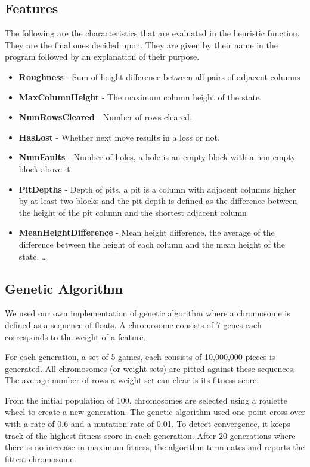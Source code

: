 \documentclass[twocolumn,12pt,journal]{IEEEtran_modified}
\begin{document}
\subsection{Features}
The following are the characteristics that are evaluated in the heuristic function. They are the final ones decided upon. They are given by their name in the program followed by an explanation of their purpose.
\begin{itemize}
  \item \textbf{Roughness} - Sum of height difference between all pairs of adjacent columns
  \item \textbf{MaxColumnHeight} - The maximum column height of the state.
  \item \textbf{NumRowsCleared} - Number of rows cleared.
  \item \textbf{HasLost} - Whether next move results in a loss or not.
  \item \textbf{NumFaults} - Number of holes, a hole is an empty block with a non-empty block above it
  \item \textbf{PitDepths} - Depth of pits, a pit is a column with adjacent columns higher by at least two blocks and the pit depth is defined as the difference between the height of the pit column and the shortest adjacent column 
  \item \textbf{MeanHeightDifference} - Mean height difference, the average of the difference between the height of each column and the mean height of the state. \ldots
\end{itemize}

\subsection{Genetic Algorithm}
We used our own implementation of genetic algorithm where a chromosome is defined as a sequence of floats. A chromosome consists of 7 genes each corresponds to the weight of a feature.

For each generation, a set of 5 games, each consists of 10,000,000 pieces is generated. All chromosomes (or weight sets) are pitted against these sequences. The average number of rows a weight set can clear is its fitness score.

From the initial population of 100, chromosomes are selected using a roulette wheel to create a new generation. The genetic algorithm used one-point cross-over with a rate of 0.6 and a mutation rate of 0.01. To detect convergence, it keeps track of the highest fitness score in each generation. After 20 generations where there is no increase in maximum fitness, the algorithm terminates and reports the fittest chromosome.
\end{document}
